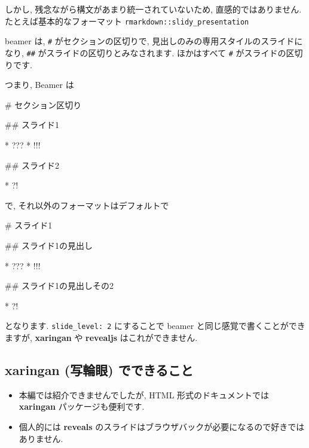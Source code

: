 \documentclass[
]{ltjsarticle}
\newenvironment{Shaded}{\begin{snugshade}}{\end{snugshade}}
\newcommand{\FunctionTok}[1]{\textcolor[rgb]{0.00,0.00,0.00}{#1}}
\newcommand{\NormalTok}[1]{#1}
\newcommand{\SpecialStringTok}[1]{\textcolor[rgb]{0.31,0.60,0.02}{#1}}
\providecommand{\tightlist}{%
  \setlength{\itemsep}{0pt}\setlength{\parskip}{0pt}}
\begin{document}
しかし, 残念ながら構文があまり統一されていないため, 直感的ではありません. たとえば基本的なフォーマット \texttt{rmarkdown::slidy\_presentation}

beamer は, \texttt{\#} がセクションの区切りで, 見出しのみの専用スタイルのスライドになり, \texttt{\#\#} がスライドの区切りとみなされます. ほかはすべて \texttt{\#} がスライドの区切りです.

つまり, Beamer は

\begin{Shaded}
\begin{Highlighting}[]
\FunctionTok{\# セクション区切り}

\FunctionTok{\#\# スライド1}

\SpecialStringTok{* }\NormalTok{???}
\SpecialStringTok{* }\NormalTok{!!!}

\FunctionTok{\#\# スライド2}

\SpecialStringTok{* }\NormalTok{?!}
\end{Highlighting}
\end{Shaded}

で, それ以外のフォーマットはデフォルトで

\begin{Shaded}
\begin{Highlighting}[]
\FunctionTok{\# スライド1}

\FunctionTok{\#\# スライド1の見出し}

\SpecialStringTok{* }\NormalTok{???}
\SpecialStringTok{* }\NormalTok{!!!}

\FunctionTok{\#\# スライド1の見出しその2}

\SpecialStringTok{* }\NormalTok{?!}
\end{Highlighting}
\end{Shaded}

となります. \texttt{slide\_level:\ 2} にすることで beamer と同じ感覚で書くことができますが, \textbf{xaringan} や \textbf{revealjs} はこれができません.

\hypertarget{xaringan-ux5199ux8f2aux773c-ux3067ux3067ux304dux308bux3053ux3068}{%
\subsection{\texorpdfstring{\textbf{xaringan} (写輪眼) でできること}{xaringan (写輪眼) でできること}}\label{xaringan-ux5199ux8f2aux773c-ux3067ux3067ux304dux308bux3053ux3068}}

\begin{itemize}
\tightlist
\item
  本編では紹介できませんでしたが, HTML 形式のドキュメントでは \textbf{xaringan} パッケージも便利です.
\item
  個人的には \textbf{reveals} のスライドはブラウザバックが必要になるので好きではありません.
\end{itemize}
\end{document}
